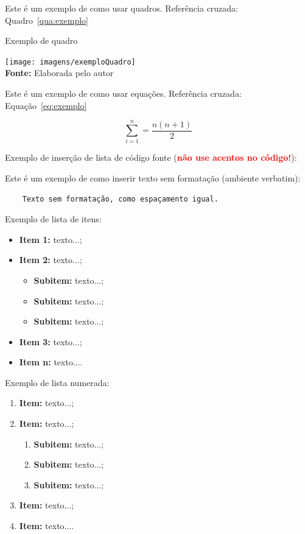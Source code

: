 Este é um exemplo de como usar quadros. Referência cruzada: Quadro~\ref{qua:exemplo}

\FloatBarrier
\begin{quadro}[!htbp]
	\centering
	\caption{Exemplo de quadro}
	\texttt{[image: imagens/exemploQuadro]}
	\\\textbf{Fonte:} Elaborada pelo autor
	\label{qua:exemplo}
\end{quadro}
\FloatBarrier


Este é um exemplo de como usar equações. Referência cruzada: Equação~\ref{eq:exemplo}

\begin{equation}
\sum_{i=1}^{n} = \frac{n(n+1)}{2}
\label{eq:exemplo}
\end{equation}


Exemplo de inserção de lista de código fonte (\textbf{\textcolor{red}{não use acentos no código!}}):

 



Este é um exemplo de como inserir texto sem formatação (ambiente verbatim):

\begin{verbatim}
	Texto sem formatação, como espaçamento igual.
\end{verbatim}


Exemplo de lista de itens:

\begin{itemize}
	\item \textbf{Item 1:} texto...;
	\item \textbf{Item 2:} texto...;
    \begin{itemize}
            \item \textbf{Subitem:} texto...;
            \item \textbf{Subitem:} texto...;
            \item \textbf{Subitem:} texto...;
        \end{itemize}
	\item \textbf{Item 3:} texto...;
	\item \textbf{Item n:} texto....
\end{itemize}


Exemplo de lista numerada:

\begin{enumerate}
	\item \textbf{Item:} texto...;
	\item \textbf{Item:} texto...;
    \begin{enumerate}
        \item \textbf{Subitem:} texto...;
        \item \textbf{Subitem:} texto...;
        \item \textbf{Subitem:} texto...;
    \end{enumerate}
	\item \textbf{Item:} texto...;
	\item \textbf{Item:} texto....
\end{enumerate}


